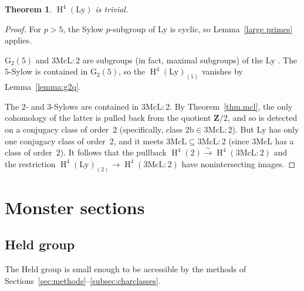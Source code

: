 \documentclass[pdftex]{sigma}
\numberwithin{equation}{section}
\newtheorem{Theorem}{Theorem}[section]
\newcommand\bZ{\mathbf Z}
\newcommand\rb{\mathrm b}
\DeclareMathOperator\homology{H}
\renewcommand\H{\homology}
\newcommand\<\langle
\renewcommand\>\rangle
\begin{document}
\begin{Theorem}$\H^4(\mathrm{Ly})$ is trivial.
\end{Theorem}

\begin{proof}For $p>5$, the Sylow $p$-subgroup of $\mathrm{Ly}$ is cyclic, so Lemma~\ref{large primes} applies.

$\mathrm{G}_2(5)$ and $3\mathrm{McL}:2$ are subgroups (in fact, maximal subgroups) of the $\mathrm{Ly}$ \cite[Propositions~2.5 and~5.4]{MR0299674}. The $5$-Sylow is contained in $\mathrm{G}_2(5)$, so the $\H^4(\mathrm{Ly})_{(5)}$ vanishes by Lemma~\ref{lemma:g2q}.

The $2$- and $3$-Sylows are contained in $3\mathrm{McL}:2$. By Theorem~\ref{thm.mcl}, the only cohomology of the latter is pulled back from the quotient $\bZ/2$, and so is detected on a conjugacy class of order~$2$ (specifically, class $2\rb \in 3\mathrm{McL}:2$). But $\mathrm{Ly}$ has only one conjugacy class of order~$2$, and it meets $3\mathrm{McL} \subseteq 3\mathrm{McL}:2$ (since $3\mathrm{McL}$ has a class of order~$2$). It follows that the pullback $\H^4(2) \overset\sim\to \H^4(3\mathrm{McL}:2)$ and the restriction $\H^4(\mathrm{Ly})_{(2)} \to \H^4(3\mathrm{McL}:2)$ have nonintersecting images.
\end{proof}

\section{Monster sections}\label{sec:monsters}

\subsection{Held group}

The Held group is small enough to be accessible by the methods of Sections~\ref{sec:methods}--\ref{subsec:charclasses}.
\end{document}
